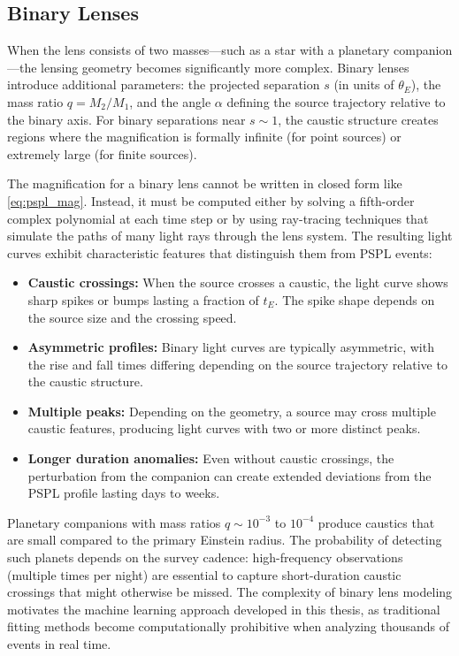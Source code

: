 \subsection{Binary Lenses}
\label{sec:binary_lensing}

When the lens consists of two masses—such as a star with a planetary companion—the lensing geometry becomes significantly more complex. Binary lenses introduce additional parameters: the projected separation $s$ (in units of $\theta_E$), the mass ratio $q = M_2/M_1$, and the angle $\alpha$ defining the source trajectory relative to the binary axis. For binary separations near $s \sim 1$, the caustic structure creates regions where the magnification is formally infinite (for point sources) or extremely large (for finite sources).

The magnification for a binary lens cannot be written in closed form like \cref{eq:pspl_mag}. Instead, it must be computed either by solving a fifth-order complex polynomial at each time step or by using ray-tracing techniques that simulate the paths of many light rays through the lens system. The resulting light curves exhibit characteristic features that distinguish them from PSPL events:

\begin{itemize}
  \item \textbf{Caustic crossings:} When the source crosses a caustic, the light curve shows sharp spikes or bumps lasting a fraction of $t_E$. The spike shape depends on the source size and the crossing speed.
  \item \textbf{Asymmetric profiles:} Binary light curves are typically asymmetric, with the rise and fall times differing depending on the source trajectory relative to the caustic structure.
  \item \textbf{Multiple peaks:} Depending on the geometry, a source may cross multiple caustic features, producing light curves with two or more distinct peaks.
  \item \textbf{Longer duration anomalies:} Even without caustic crossings, the perturbation from the companion can create extended deviations from the PSPL profile lasting days to weeks.
\end{itemize}

Planetary companions with mass ratios $q \sim 10^{-3}$ to $10^{-4}$ produce caustics that are small compared to the primary Einstein radius. The probability of detecting such planets depends on the survey cadence: high-frequency observations (multiple times per night) are essential to capture short-duration caustic crossings that might otherwise be missed. The complexity of binary lens modeling motivates the machine learning approach developed in this thesis, as traditional fitting methods become computationally prohibitive when analyzing thousands of events in real time.


